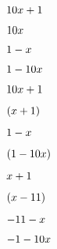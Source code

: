 \documentclass[10pt,a4paper]{article}
\begin{document}
	$\binomio{10}{1}$
	
	$\binomio{0}{1}$
	
	$\binomio{-1}{1}$
	
	$\binomio{-10}{1}$
	
	$\binomio{10}{1}$
	
	$\binomiop{1}{1}$
	
	$\binomio{-1}{1}$
	
	$\binomiop{-10}{1}$
	
	$\binomio{1}{1}$
	
	$\binomiop{1}{-11}$
	
	$\binomio{-1}{-11}$
	
	$\binomio{-10}{-1}$
	
\end{document}
